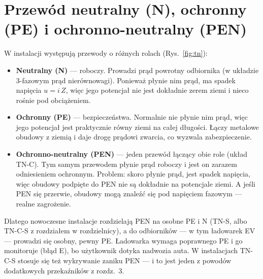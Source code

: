 \documentclass[11pt]{article}
\begin{document}
\section{Przewód neutralny (N), ochronny (PE) i ochronno-neutralny (PEN)}\label{sec:pen}

W instalacji występują przewody o różnych rolach (Rys.~\ref{fig:tn}):
\begin{itemize}
 \item \textbf{Neutralny (N)} --- roboczy. Prowadzi prąd powrotny odbiornika (w układzie 3-fazowym prąd nierównowagi). Ponieważ płynie nim prąd, ma spadek napięcia \(u=i\,Z\), więc jego potencjał nie jest dokładnie zerem ziemi i nieco rośnie pod obciążeniem.
 \item \textbf{Ochronny (PE)} --- bezpieczeństwa. Normalnie nie płynie nim prąd, więc jego potencjał jest praktycznie równy ziemi na całej długości. Łączy metalowe obudowy z ziemią i daje drogę prądowi zwarcia, co wyzwala zabezpieczenie.
 \item \textbf{Ochronno-neutralny (PEN)} --- jeden przewód łączący obie role (układ TN-C). Tym samym przewodem płynie prąd roboczy i jest on zarazem odniesieniem ochronnym. Problem: skoro płynie prąd, jest spadek napięcia, więc obudowy podpięte do PEN nie są dokładnie na potencjale ziemi. A jeśli PEN się przerwie, obudowy mogą znaleźć się pod napięciem fazowym --- realne zagrożenie.
\end{itemize}

Dlatego nowoczesne instalacje rozdzielają PEN na osobne PE i N (TN-S, albo TN-C-S z rozdziałem w rozdzielnicy), a do odbiorników --- w tym ładowarek EV --- prowadzi się osobny, pewny PE. Ładowarka wymaga poprawnego PE i go monitoruje (błąd E), bo użytkownik dotyka nadwozia auta. W instalacjach TN-C-S stosuje się też wykrywanie zaniku PEN --- i to jest jeden z powodów dodatkowych przekaźników z rozdz.~3.
\end{document}
